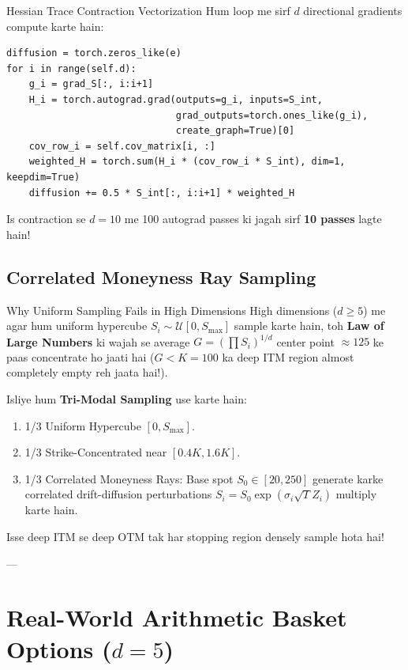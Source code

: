 \documentclass[11pt,a4paper,oneside]{book}
\begin{document}
\begin{codebox}{Hessian Trace Contraction Vectorization}
Hum loop me sirf $d$ directional gradients compute karte hain:
\begin{verbatim}
diffusion = torch.zeros_like(e)
for i in range(self.d):
    g_i = grad_S[:, i:i+1]
    H_i = torch.autograd.grad(outputs=g_i, inputs=S_int, 
                              grad_outputs=torch.ones_like(g_i), 
                              create_graph=True)[0]
    cov_row_i = self.cov_matrix[i, :]
    weighted_H = torch.sum(H_i * (cov_row_i * S_int), dim=1, keepdim=True)
    diffusion += 0.5 * S_int[:, i:i+1] * weighted_H
\end{verbatim}
Is contraction se $d=10$ me 100 autograd passes ki jagah sirf \textbf{10 passes} lagte hain!
\end{codebox}

\section{Correlated Moneyness Ray Sampling}
\begin{intuitionbox}{Why Uniform Sampling Fails in High Dimensions}
High dimensions ($d \ge 5$) me agar hum uniform hypercube $S_i \sim \mathcal{U}[0, S_{\max}]$ sample karte hain, toh \textbf{Law of Large Numbers} ki wajah se average $G = (\prod S_i)^{1/d}$ center point $\approx 125$ ke paas concentrate ho jaati hai ($G < K=100$ ka deep ITM region almost completely empty reh jaata hai!).

Isliye hum \textbf{Tri-Modal Sampling} use karte hain:
\begin{enumerate}
    \item 1/3 Uniform Hypercube $[0, S_{\max}]$.
    \item 1/3 Strike-Concentrated near $[0.4K, 1.6K]$.
    \item 1/3 Correlated Moneyness Rays: Base spot $S_0 \in [20, 250]$ generate karke correlated drift-diffusion perturbations $S_i = S_0 \exp(\sigma_i \sqrt{T} Z_i)$ multiply karte hain.
\end{enumerate}
Isse deep ITM se deep OTM tak har stopping region densely sample hota hai!
\end{intuitionbox}

---

\chapter{Real-World Arithmetic Basket Options ($d=5$)}
\end{document}
